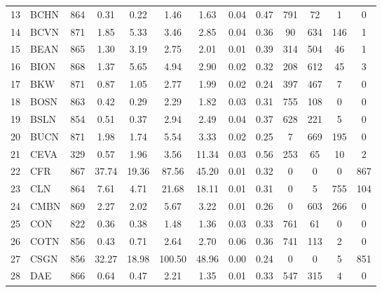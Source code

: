 \documentclass[11pt,a4paper]{article}
\begin{document}
\begin{doublespacing}
\begin{small}
\begin{longtable}{llc|cc|cc|cc|cccc}
                13  & BCHN  & 864 & 0.31   & 0.22     & 1.46   & 1.63     & 0.04  & 0.47     & 791   & 72    & 1     & 0     \\
                14  & BCVN  & 871 & 1.85   & 5.33     & 3.46   & 2.85     & 0.04  & 0.36     & 90    & 634   & 146   & 1     \\
                15  & BEAN  & 865 & 1.30   & 3.19     & 2.75   & 2.01     & 0.01  & 0.39     & 314   & 504   & 46    & 1     \\
                16  & BION  & 868 & 1.37   & 5.65     & 4.94   & 2.90     & 0.02  & 0.32     & 208   & 612   & 45    & 3     \\
                17  & BKW   & 871 & 0.87   & 1.05     & 2.77   & 1.99     & 0.02  & 0.24     & 397   & 467   & 7     & 0     \\
                18  & BOSN  & 863 & 0.42   & 0.29     & 2.29   & 1.82     & 0.03  & 0.31     & 755   & 108   & 0     & 0     \\
                19  & BSLN  & 854 & 0.51   & 0.37     & 2.94   & 2.49     & 0.04  & 0.37     & 628   & 221   & 5     & 0     \\
                20  & BUCN  & 871 & 1.98   & 1.74     & 5.54   & 3.33     & 0.02  & 0.25     & 7     & 669   & 195   & 0     \\
                21  & CEVA  & 329 & 0.57   & 1.96     & 3.56   & 11.34    & 0.03  & 0.56     & 253   & 65    & 10    & 2     \\
                22  & CFR   & 867 & 37.74  & 19.36    & 87.56  & 45.20    & 0.01  & 0.32     & 0     & 0     & 0     & 867   \\
                23  & CLN   & 864 & 7.61   & 4.71     & 21.68  & 18.11    & 0.01  & 0.31     & 0     & 5     & 755   & 104   \\
                24  & CMBN  & 869 & 2.27   & 2.02     & 5.67   & 3.22     & 0.01  & 0.26     & 0     & 603   & 266   & 0     \\
                25  & CON   & 822 & 0.36   & 0.38     & 1.48   & 1.36     & 0.03  & 0.33     & 761   & 61    & 0     & 0     \\
                26  & COTN  & 856 & 0.43   & 0.71     & 2.64   & 2.70     & 0.06  & 0.36     & 741   & 113   & 2     & 0     \\
                27  & CSGN  & 856 & 32.27  & 18.98    & 100.50 & 48.96    & 0.00  & 0.24     & 0     & 0     & 5     & 851   \\
                28  & DAE   & 866 & 0.64   & 0.47     & 2.21   & 1.35     & 0.01  & 0.33     & 547   & 315   & 4     & 0     \\

\end{longtable}
\end{small}
\end{doublespacing}
\end{document}
